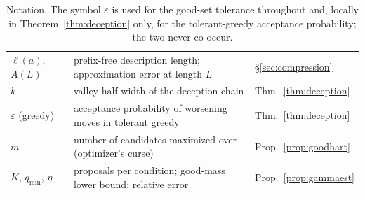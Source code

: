 \documentclass{article}
\theoremstyle{plain}
\theoremstyle{definition}
\theoremstyle{remark}
\newcommand{\len}{\ell}
\newcommand{\eps}{\varepsilon}
\begin{document}
\begin{table}[h]
\begin{tabular}{@{}lll@{}}
$\len(a)$, $A(L)$ & prefix-free description length; approximation error at length $L$ & \S\ref{sec:compression} \\
$k$ & valley half-width of the deception chain & Thm.~\ref{thm:deception} \\
$\eps$ (greedy) & acceptance probability of worsening moves in tolerant greedy & Thm.~\ref{thm:deception} \\
$m$ & number of candidates maximized over (optimizer's curse) & Prop.~\ref{prop:goodhart} \\
$K$, $q_{\min}$, $\eta$ & proposals per condition; good-mass lower bound; relative error & Prop.~\ref{prop:gammaest} \\
\bottomrule
\end{tabular}
\caption{Notation. The symbol $\eps$ is used for the good-set tolerance throughout and, locally in Theorem~\ref{thm:deception} only, for the tolerant-greedy acceptance probability; the two never co-occur.}
\label{tab:notation}
\end{table}
\end{document}
